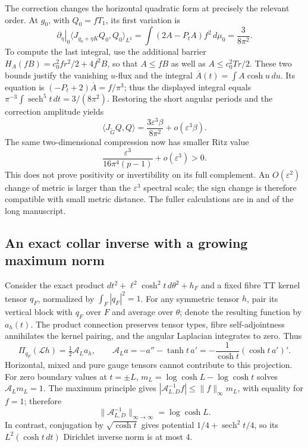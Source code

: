\documentclass[a4paper,11pt]{article}
\numberwithin{equation}{section}
\theoremstyle{definition}
\begin{document}
The correction changes the horizontal quadratic form at precisely the
relevant order. At $g_0$, with $Q_0=fT_1$, its first variation is
\[
\left.\partial_\eta\right|_0
\langle J_{g_0+\eta K}Q_0,Q_0\rangle_{L^2}
=\int(2A-P_tA)f^2\,d\mu_0=\frac3{8\pi^2}.
\]
To compute the last integral, use the additional barrier
$H_A(fB)=c_0^2fr^2/2+4f^2B$, so that $A\le fB$ as well as
$A\le c_0^2Tr/2$. These two bounds justify the vanishing $u$-flux and the
integral $\overline A(t)=\int A\cosh u\,du$. Its equation is
$(-P_t+2)\overline A=f/\pi^3$; thus the displayed integral equals
$\pi^{-3}\int\operatorname{sech}^5t\,dt=3/(8\pi^2)$.
Restoring the short angular periods and the correction amplitude yields
\[
\langle J_{\widetilde G}Q,Q\rangle
=\frac{3\varepsilon^3\beta}{8\pi^2}+o(\varepsilon^3\beta).
\]
The same two-dimensional compression now has smaller Ritz value
\begin{equation}\label{eq:ED-corrected-ritz}
\frac{\varepsilon^3}{16\pi^4(p-1)}+o(\varepsilon^3)>0.
\end{equation}
This does not prove positivity or invertibility on its full complement.
An $O(\varepsilon^2)$ change of metric is larger than the
$\varepsilon^3$ spectral scale; the sign change is therefore compatible with
small metric distance. The fuller calculations are in
 and  of the long manuscript.

\subsection{An exact collar inverse with a growing maximum norm}
Consider the exact product
$dt^2+\ell^2\cosh^2t\,d\theta^2+h_F$ and a fixed fibre TT kernel tensor
$q_F$, normalized by $\int_F|q_F|^2=1$.
For any symmetric tensor $h$, pair its vertical block with $q_F$ over $F$
and average over $\theta$; denote the resulting function by $a_h(t)$.
The product connection preserves tensor types, fibre self-adjointness
annihilates the kernel pairing, and the angular Laplacian integrates to zero.
Thus
\begin{equation}\label{eq:ED-TT-projection}
\Pi_{q_F}(\mathcal Lh)=\tfrac12\mathcal A_La_h,\qquad
\mathcal A_La=-a''-\tanh t\,a'
=-\frac1{\cosh t}(\cosh t\,a')'.
\end{equation}
Horizontal, mixed and pure gauge tensors cannot contribute to this projection.
For zero boundary values at $t=\pm L$,
$m_L=\log\cosh L-\log\cosh t$ solves $\mathcal A_Lm_L=1$.
The maximum principle gives
$|\mathcal A_{L,D}^{-1}f|\le\|f\|_\infty m_L$, with equality for $f=1$;
therefore
\begin{equation}\label{eq:ED-collar-inverse}
\|\mathcal A_{L,D}^{-1}\|_{\infty\to\infty}=\log\cosh L.
\end{equation}
In contrast, conjugation by $\sqrt{\cosh t}$ gives potential
$1/4+\operatorname{sech}^2t/4$, so its
$L^2(\cosh t\,dt)$ Dirichlet inverse norm is at most 4.
\end{document}
